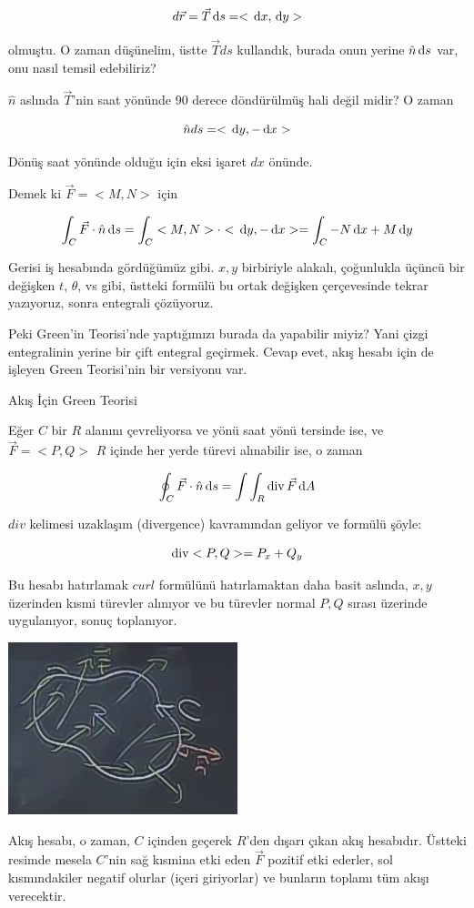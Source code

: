 \documentclass[12pt,fleqn]{article}\usepackage{../../common}
\begin{document}
$$ d\vec{r} = \vec{T} \,\mathrm{d} s = < \,\mathrm{d} x, \,\mathrm{d} y > $$

olmuştu. O zaman düşünelim, üstte $\vec{T} ds$ kullandık, burada onun
yerine $\hat{n} \,\mathrm{d} s$ var, onu nasıl temsil edebiliriz? 

$\hat{n}$ aslında $\vec{T}$'nin saat yönünde 90 derece döndürülmüş hali
değil midir? O zaman 

$$ \hat{n}ds = < \,\mathrm{d} y,-\,\mathrm{d} x > $$

Dönüş saat yönünde olduğu için eksi işaret $dx$ önünde. 

Demek ki $\vec{F} = < M,N >$ için

$$
\int_C \vec{F} \cdot \hat{n} \,\mathrm{d} s =
\int_C  < M,N > \cdot < \,\mathrm{d} y,-\,\mathrm{d} x > =  \int_C -N \,\mathrm{d} x + M \,\mathrm{d} y
$$

Gerisi iş hesabında gördüğümüz gibi. $x,y$ birbiriyle alakalı, çoğunlukla
üçüncü bir değişken $t$, $\theta$, vs gibi, üstteki formülü bu ortak
değişken çerçevesinde tekrar yazıyoruz, sonra entegrali çözüyoruz. 

Peki Green'in Teorisi'nde yaptığımızı burada da yapabilir miyiz? Yani çizgi
entegralinin yerine bir çift entegral geçirmek. Cevap evet, akış hesabı için de
işleyen Green Teorisi'nin bir versiyonu var.

Akış İçin Green Teorisi

Eğer $C$ bir $R$ alanını çevreliyorsa ve yönü saat yönü tersinde ise, ve
$\vec{F}=< P,Q >$ $R$ içinde her yerde türevi alınabilir ise, o zaman 

$$ \oint_C \vec{F} \cdot \hat{n} \,\mathrm{d} s = 
\int \int_R \operatorname{div} \vec{F} \,\mathrm{d} A
$$

$div$ kelimesi uzaklaşım (divergence) kavramından geliyor ve formülü şöyle:

$$ \operatorname{div} < P,Q > = P_x + Q_y $$

Bu hesabı hatırlamak $curl$ formülünü hatırlamaktan daha basit aslında,
$x,y$ üzerinden kısmi türevler alınıyor ve bu türevler normal $P,Q$ sırası
üzerinde uygulanıyor, sonuç toplanıyor. 

\begin{center}

\includegraphics[height=5cm]{23_8.png}

\end{center}
Akış hesabı, o zaman, $C$ içinden geçerek $R$'den dışarı çıkan akış
hesabıdır. Üstteki resimde mesela $C$'nin sağ kısmina etki eden $\vec{F}$
pozitif etki ederler, sol kısmındakiler negatif olurlar (içeri giriyorlar)
ve bunların toplamı tüm akışı verecektir. 
\end{document}
